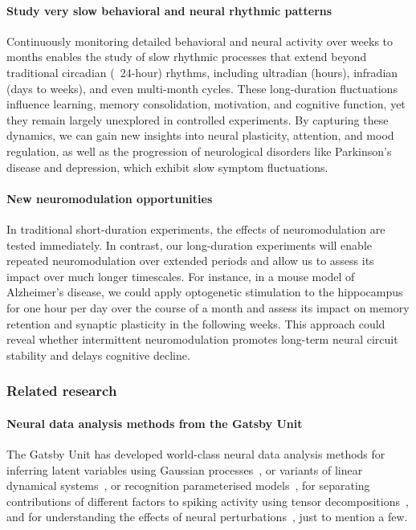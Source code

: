 \documentclass[12pt]{article}
\begin{document}
\paragraph{Study very slow behavioral and neural rhythmic patterns}
%
Continuously monitoring detailed behavioral and neural activity over weeks to
months enables the study of slow rhythmic processes that extend beyond
traditional circadian (~24-hour) rhythms, including ultradian (hours),
infradian (days to weeks), and even multi-month cycles. These long-duration
fluctuations influence learning, memory consolidation, motivation, and
cognitive function, yet they remain largely unexplored in controlled
experiments. By capturing these dynamics, we can gain new insights into neural
plasticity, attention, and mood regulation, as well as the progression of
neurological disorders like Parkinson’s disease and depression, which exhibit
slow symptom fluctuations.

\paragraph{New neuromodulation opportunities}
%
In traditional short-duration experiments, the effects of neuromodulation are
tested immediately. In contrast, our long-duration experiments will enable
repeated neuromodulation over extended periods and allow us to assess its
impact over much longer timescales.
%
For instance, in a mouse model of Alzheimer's disease, we could apply
optogenetic stimulation to the hippocampus for one hour per day over the course
of a month and assess its impact on memory retention and synaptic plasticity in
the following weeks. This approach could reveal whether intermittent
neuromodulation promotes long-term neural circuit stability and delays
cognitive decline.

\subsubsection{Related research}
\label{sec:relatedResearchOfflineAnalysis}

\paragraph{Neural data analysis methods from the Gatsby Unit}
%
The Gatsby Unit has developed world-class neural data analysis methods for
%
inferring latent variables using Gaussian
processes~\citep{yuEtAl09,dunckerAndSahani18,ruttenEtAl20,yuEtAl24}, or variants
of linear dynamical systems~\citep{buesinEtAl12,mackeEtAl15}, or recognition
parameterised models~\citep{walkerEtAl23},
%
for separating contributions of different factors to spiking activity using
tensor decompositions~\citep{soulatEtAl21},
%
and for understanding the effects of neural perturbations~\citep{oSheaEtAl22},
just to mention a few.
\end{document}
